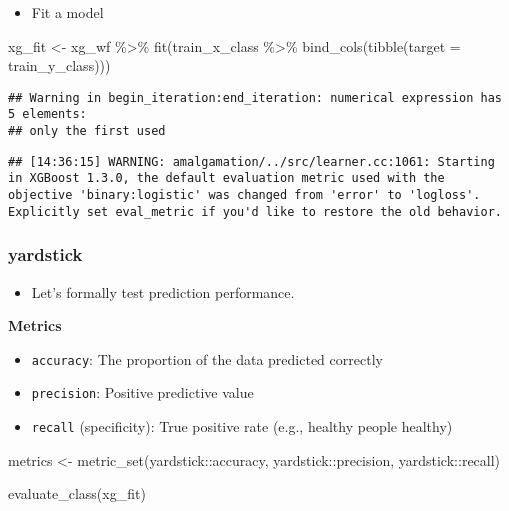 \documentclass[
]{book}
\newenvironment{Shaded}{\begin{snugshade}}{\end{snugshade}}
\newcommand{\AttributeTok}[1]{\textcolor[rgb]{0.77,0.63,0.00}{#1}}
\newcommand{\FunctionTok}[1]{\textcolor[rgb]{0.00,0.00,0.00}{#1}}
\newcommand{\NormalTok}[1]{#1}
\newcommand{\OtherTok}[1]{\textcolor[rgb]{0.56,0.35,0.01}{#1}}
\newcommand{\SpecialCharTok}[1]{\textcolor[rgb]{0.00,0.00,0.00}{#1}}
\providecommand{\tightlist}{%
  \setlength{\itemsep}{0pt}\setlength{\parskip}{0pt}}
\begin{document}
\begin{itemize}
\tightlist
\item
  Fit a model
\end{itemize}

\begin{Shaded}
\begin{Highlighting}[]
\NormalTok{xg\_fit }\OtherTok{\textless{}{-}}\NormalTok{ xg\_wf }\SpecialCharTok{\%\textgreater{}\%} \FunctionTok{fit}\NormalTok{(train\_x\_class }\SpecialCharTok{\%\textgreater{}\%} \FunctionTok{bind\_cols}\NormalTok{(}\FunctionTok{tibble}\NormalTok{(}\AttributeTok{target =}\NormalTok{ train\_y\_class)))}
\end{Highlighting}
\end{Shaded}

\begin{verbatim}
## Warning in begin_iteration:end_iteration: numerical expression has 5 elements:
## only the first used
\end{verbatim}

\begin{verbatim}
## [14:36:15] WARNING: amalgamation/../src/learner.cc:1061: Starting in XGBoost 1.3.0, the default evaluation metric used with the objective 'binary:logistic' was changed from 'error' to 'logloss'. Explicitly set eval_metric if you'd like to restore the old behavior.
\end{verbatim}

\hypertarget{yardstick-3}{%
\subsubsection{yardstick}\label{yardstick-3}}

\begin{itemize}
\tightlist
\item
  Let's formally test prediction performance.
\end{itemize}

\textbf{Metrics}

\begin{itemize}
\item
  \texttt{accuracy}: The proportion of the data predicted correctly
\item
  \texttt{precision}: Positive predictive value
\item
  \texttt{recall} (specificity): True positive rate (e.g., healthy people healthy)
\end{itemize}

\begin{Shaded}
\begin{Highlighting}[]
\NormalTok{metrics }\OtherTok{\textless{}{-}} \FunctionTok{metric\_set}\NormalTok{(yardstick}\SpecialCharTok{::}\NormalTok{accuracy, }
\NormalTok{                      yardstick}\SpecialCharTok{::}\NormalTok{precision, }
\NormalTok{                      yardstick}\SpecialCharTok{::}\NormalTok{recall)}

\FunctionTok{evaluate\_class}\NormalTok{(xg\_fit)}
\end{Highlighting}
\end{Shaded}
\end{document}
